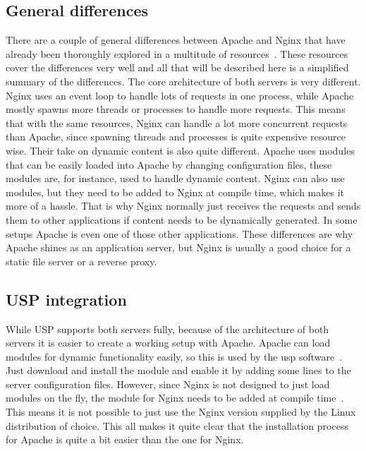 \documentclass[twoside,openright]{uva-bachelor-thesis}
\begin{document}
\subsection{General differences}
There are a couple of general differences between Apache and Nginx that have
already been thoroughly explored in a multitude of
resources~\autocites{nginx1}{nginx2}{apachevsnginx}{nginxperformancescale}.
These resources cover the differences very well and all that will be described
here is a simplified summary of the differences. The core architecture of both
servers is very different. Nginx uses an event loop to handle lots of requests
in one process, while Apache mostly spawns more threads or processes to handle
more requests. This means that with the same resources, Nginx can handle a lot
more concurrent requests than Apache, since spawning threads and processes is
quite expensive resource wise. Their take on dynamic content is also quite
different. Apache uses modules that can be easily loaded into Apache by changing
configuration files, these modules are, for instance, used to handle dynamic
content.  Nginx can also use modules, but they need to be added to Nginx at
compile time, which makes it more of a hassle.  That is why Nginx normally just
receives the requests and sends them to other applications if content needs to
be dynamically generated. In some setups Apache is even one of those other
applications. These differences are why Apache shines as an application server,
but Nginx is usually a good choice for a static file server or a reverse proxy.


\subsection{USP integration}
While USP supports both servers fully, because of the architecture of both
servers it is easier to create a working setup with Apache. Apache can load
modules for dynamic functionality easily, so this is used by the \gls{usp}
software~\autocite{uspapache}. Just download and install the module
and enable it by adding some lines to the server configuration files. However,
since Nginx is not designed to just load modules on the fly, the \usp module for
Nginx needs to be added at compile time~\autocite{uspnginx}.  This means it is
not possible to just use the Nginx version supplied by the Linux distribution of
choice.  This all makes it quite clear that the installation process for Apache
is quite a bit easier than the one for Nginx.
\end{document}
